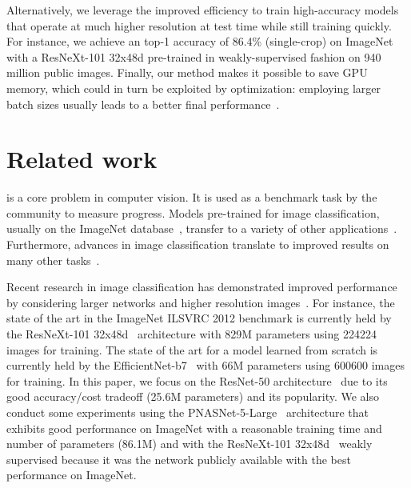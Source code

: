 \documentclass{article}
\makeatletter
\renewcommand{\paragraph}{\@startsection{paragraph}{4}{\z@}{0.4em}{-1em}{\normalfont\normalsize\bfseries}}
\makeatother
\begin{document}
Alternatively, we leverage the improved efficiency to train high-accuracy models that operate at much higher resolution at test time while still training quickly.
For instance, we achieve an top-1 accuracy of 86.4\% (single-crop) on ImageNet with a ResNeXt-101 32x48d pre-trained in weakly-supervised fashion on 940 million public images.  
Finally, our method makes it possible to save GPU memory, which could in turn be exploited by optimization: employing larger batch sizes usually leads to a better final performance~\cite{Tong2018BagofTricks}.
 \section{Related work}\label{sec:related}

\paragraph{Image classification} is a core problem in computer vision. 
It is used as a benchmark task by the community to measure progress.
Models pre-trained for image classification, usually  on the ImageNet database~\cite{deng2009imagenet}, transfer to a variety of other applications~\cite{oquab2014learning}. 
Furthermore, advances in image classification translate to improved results on many other tasks~\cite{gordo2017end,Kornblith2018DoBetter}.

Recent research in image classification has demonstrated improved performance by considering larger networks and higher resolution images~\cite{Yanping2018GPipe,mahajan2018exploring}.
For instance, the state of the art in the ImageNet ILSVRC 2012 benchmark is currently held by the ResNeXt-101 32x48d~\cite{mahajan2018exploring} architecture with 829M parameters using 224224 images  for training.
The state of the art for a model learned  from  scratch  is  currently  held  by  the EfficientNet-b7~\cite{tan2019efficientnet} with 66M parameters using 600600 images  for training.
In this paper, we focus on the ResNet-50 architecture~\cite{He2016ResNet} due to its good accuracy/cost tradeoff (25.6M parameters) and its popularity.
We also conduct some experiments using the PNASNet-5-Large~\cite{Liu2018PNAS} architecture  that exhibits good performance on ImageNet with a reasonable training time and number of parameters (86.1M) and with the ResNeXt-101 32x48d~\cite{mahajan2018exploring} weakly supervised because it was the network publicly available with the best performance on ImageNet.
\end{document}
